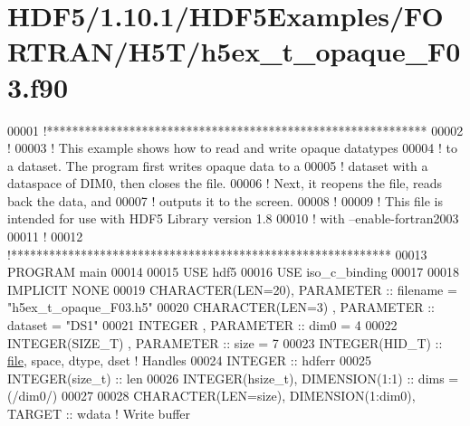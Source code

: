 \hypertarget{_h_d_f5_21_810_81_2_h_d_f5_examples_2_f_o_r_t_r_a_n_2_h5_t_2h5ex__t__opaque___f03_8f90_source}{}\section{H\+D\+F5/1.10.1/\+H\+D\+F5\+Examples/\+F\+O\+R\+T\+R\+A\+N/\+H5\+T/h5ex\+\_\+t\+\_\+opaque\+\_\+\+F03.f90}
\label{_h_d_f5_21_810_81_2_h_d_f5_examples_2_f_o_r_t_r_a_n_2_h5_t_2h5ex__t__opaque___f03_8f90_source}

\begin{DoxyCode}
00001 \textcolor{comment}{!************************************************************}
00002 \textcolor{comment}{!}
00003 \textcolor{comment}{!  This example shows how to read and write opaque datatypes}
00004 \textcolor{comment}{!  to a dataset.  The program first writes opaque data to a}
00005 \textcolor{comment}{!  dataset with a dataspace of DIM0, then closes the file.}
00006 \textcolor{comment}{!  Next, it reopens the file, reads back the data, and}
00007 \textcolor{comment}{!  outputs it to the screen.}
00008 \textcolor{comment}{!}
00009 \textcolor{comment}{!  This file is intended for use with HDF5 Library version 1.8}
00010 \textcolor{comment}{!  with --enable-fortran2003}
00011 \textcolor{comment}{!}
00012 \textcolor{comment}{!************************************************************}
00013 \textcolor{keyword}{PROGRAM} main
00014 
00015   \textcolor{keywordtype}{USE }hdf5
00016   \textcolor{keywordtype}{USE }iso\_c\_binding
00017 
00018   \textcolor{keywordtype}{IMPLICIT NONE}
00019   \textcolor{keywordtype}{CHARACTER(LEN=20)}, \textcolor{keywordtype}{PARAMETER} :: filename  = \textcolor{stringliteral}{"h5ex\_t\_opaque\_F03.h5"}
00020   \textcolor{keywordtype}{CHARACTER(LEN=3)} , \textcolor{keywordtype}{PARAMETER} :: dataset   = \textcolor{stringliteral}{"DS1"}
00021   \textcolor{keywordtype}{INTEGER}          , \textcolor{keywordtype}{PARAMETER} :: dim0      = 4
00022   \textcolor{keywordtype}{INTEGER(SIZE\_T)}  , \textcolor{keywordtype}{PARAMETER} :: size      = 7
00023   \textcolor{keywordtype}{INTEGER(HID\_T)}  :: \hyperlink{structfile}{file}, space, dtype, dset \textcolor{comment}{! Handles}
00024   \textcolor{keywordtype}{INTEGER} :: hdferr
00025   \textcolor{keywordtype}{INTEGER(size\_t)} :: len
00026   \textcolor{keywordtype}{INTEGER(hsize\_t)},   \textcolor{keywordtype}{DIMENSION(1:1)} :: dims = (/dim0/)
00027 
00028   \textcolor{keywordtype}{CHARACTER(LEN=size)}, \textcolor{keywordtype}{DIMENSION(1:dim0)}, \textcolor{keywordtype}{TARGET} :: wdata \textcolor{comment}{! Write buffer}

\end{DoxyCode}
